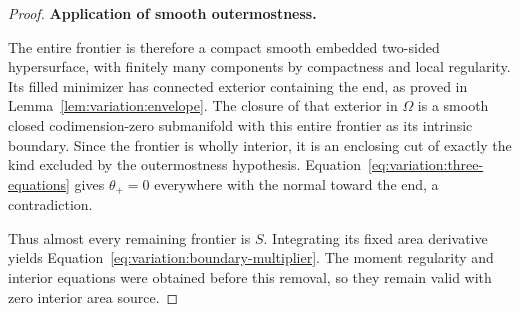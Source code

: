 \begin{proof}
\smallskip\noindent\textbf{Application of smooth outermostness.}

The entire frontier is therefore a compact smooth embedded two-sided
hypersurface, with finitely many components by compactness and local
regularity.  Its filled minimizer has connected exterior containing
the end, as proved in Lemma~\ref{lem:variation:envelope}.  The closure
of that exterior in $\Omega$ is a smooth closed codimension-zero
submanifold with this entire frontier as its intrinsic boundary.
Since the frontier is wholly interior, it is an enclosing cut of
exactly the kind excluded by the outermostness hypothesis.  Equation~\eqref{eq:variation:three-equations} gives $\theta_+=0$ everywhere
with the normal toward the end, a contradiction.

Thus almost every remaining frontier is $S$.  Integrating its fixed
area derivative yields Equation~\eqref{eq:variation:boundary-multiplier}.
The moment regularity and interior equations were obtained before
this removal, so they remain valid with zero interior area source.
\end{proof}
